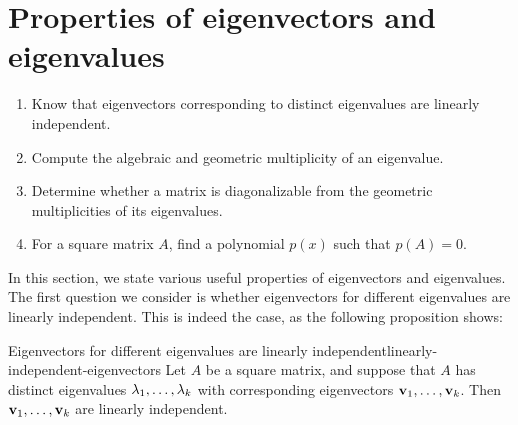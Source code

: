 \section{Properties of eigenvectors and eigenvalues}

\begin{outcome}
  \begin{enumerate}
  \item Know that eigenvectors corresponding to distinct eigenvalues
    are linearly independent.
  \item Compute the algebraic and geometric multiplicity of an
    eigenvalue.
  \item Determine whether a matrix is diagonalizable from the
    geometric multiplicities of its eigenvalues.
  \item For a square matrix $A$, find a polynomial $p(x)$ such that $p(A)=0$.
  \end{enumerate}
\end{outcome}

In this section, we state various useful properties of eigenvectors
and eigenvalues. The first question we consider is whether
eigenvectors for different eigenvalues are linearly independent. This
is indeed the case, as the following proposition shows:

\begin{proposition}{Eigenvectors for different eigenvalues are linearly independent}{linearly-independent-eigenvectors}
  Let $A$ be a square matrix, and suppose that $A$ has distinct
  eigenvalues $\lambda_1,\ldots,\lambda_k$ with
  corresponding eigenvectors $\mbox{\bf v}_1,\ldots,\mbox{\bf v}_k$.
  Then $\mbox{\bf v}_1,\ldots,\mbox{\bf v}_k$ are linearly independent.
\end{proposition}

